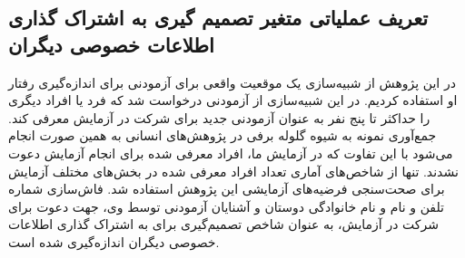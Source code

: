 \subsection*{تعریف عملیاتی متغیر تصمیم گیری به اشتراک گذاری اطلاعات خصوصی دیگران}
در این پژوهش از شبیه‌سازی یک موقعیت واقعی برای آزمودنی برای اندازه‌گیری رفتار او استفاده کردیم. در این شبیه‌سازی 
از آزمودنی درخواست شد که فرد یا افراد دیگری را حداکثر تا پنج نفر به عنوان آزمودنی جدید برای شرکت 
در آزمایش معرفی کند. جمع‌آوری نمونه به شیوه گلوله برفی در پژوهش‌های انسانی  به همین صورت  انجام می‌شود با این 
تفاوت که در آزمایش ما، افراد معرفی شده برای انجام آزمایش دعوت نشدند. تنها از شاخص‌های آماری تعداد افراد 
معرفی شده در بخش‌های مختلف آزمایش برای صحت‌سنجی فرضیه‌های آزمایشی این پژوهش استفاده شد. فاش‌سازی
 شماره تلفن و نام و نام خانوادگی دوستان و آشنایان آزمودنی توسط وی، جهت دعوت برای شرکت در آزمایش، به
 عنوان شاخص تصمیم‌گیری برای به اشتراک گذاری اطلاعات خصوصی دیگران اندازه‌گیری شده است.


